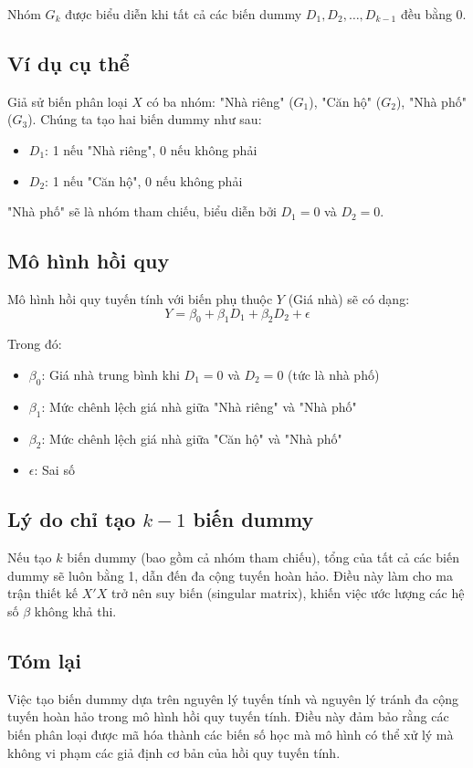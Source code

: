 \documentclass{article}
\begin{document}
Nhóm \(G_k\) được biểu diễn khi tất cả các biến dummy \(D_1, D_2, \ldots, D_{k-1}\) đều bằng 0.

\subsection*{Ví dụ cụ thể}

Giả sử biến phân loại \(X\) có ba nhóm: "Nhà riêng" (\(G_1\)), "Căn hộ" (\(G_2\)), "Nhà phố" (\(G_3\)). Chúng ta tạo hai biến dummy như sau:
\begin{itemize}
    \item \(D_1\): 1 nếu "Nhà riêng", 0 nếu không phải
    \item \(D_2\): 1 nếu "Căn hộ", 0 nếu không phải
\end{itemize}

"Nhà phố" sẽ là nhóm tham chiếu, biểu diễn bởi \(D_1 = 0\) và \(D_2 = 0\).

\subsection*{Mô hình hồi quy}

Mô hình hồi quy tuyến tính với biến phụ thuộc \(Y\) (Giá nhà) sẽ có dạng:
\[
Y = \beta_0 + \beta_1 D_1 + \beta_2 D_2 + \epsilon
\]

Trong đó:
\begin{itemize}
    \item \(\beta_0\): Giá nhà trung bình khi \(D_1 = 0\) và \(D_2 = 0\) (tức là nhà phố)
    \item \(\beta_1\): Mức chênh lệch giá nhà giữa "Nhà riêng" và "Nhà phố"
    \item \(\beta_2\): Mức chênh lệch giá nhà giữa "Căn hộ" và "Nhà phố"
    \item \(\epsilon\): Sai số
\end{itemize}

\subsection*{Lý do chỉ tạo \(k-1\) biến dummy}

Nếu tạo \(k\) biến dummy (bao gồm cả nhóm tham chiếu), tổng của tất cả các biến dummy sẽ luôn bằng 1, dẫn đến đa cộng tuyến hoàn hảo. Điều này làm cho ma trận thiết kế \(X'X\) trở nên suy biến (singular matrix), khiến việc ước lượng các hệ số \(\beta\) không khả thi.

\subsection*{Tóm lại}

Việc tạo biến dummy dựa trên nguyên lý tuyến tính và nguyên lý tránh đa cộng tuyến hoàn hảo trong mô hình hồi quy tuyến tính. Điều này đảm bảo rằng các biến phân loại được mã hóa thành các biến số học mà mô hình có thể xử lý mà không vi phạm các giả định cơ bản của hồi quy tuyến tính.
\end{document}
